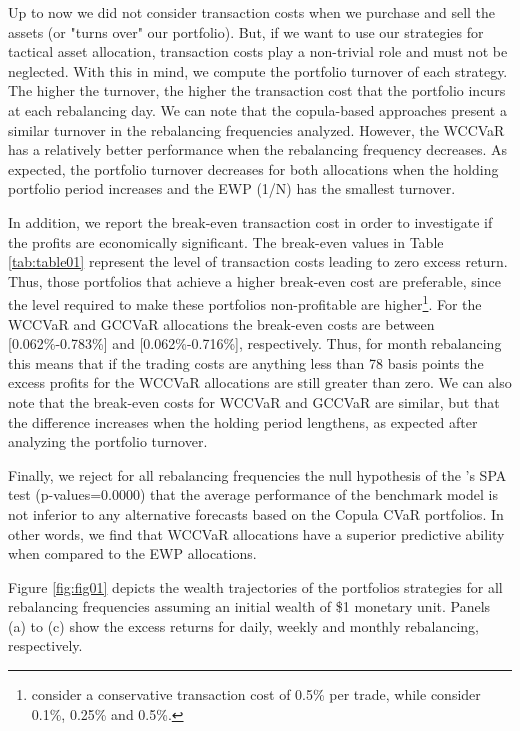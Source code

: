 \documentclass[a4paper,10pt]{article}
\begin{document}
Up to now we did not consider transaction costs when we purchase and sell
the assets (or "turns over" our portfolio). But, if we want to use our
strategies for tactical asset allocation, transaction costs play a
non-trivial role and must not be neglected. With this in mind, we compute
the portfolio turnover of each strategy. The higher the turnover, the higher
the transaction cost that the portfolio incurs at each rebalancing day. We can note that the copula-based approaches present a similar turnover in the rebalancing frequencies analyzed. However, the WCCVaR has a relatively better performance when the rebalancing frequency decreases. As expected, the portfolio turnover decreases for both allocations
when the holding portfolio period increases and the EWP (1/N) has the
smallest turnover.

In addition, we report the break-even transaction cost in order to investigate
if the profits are economically significant. The break-even values in Table
\ref{tab:table01} represent the level of transaction
costs leading to zero excess return. Thus, those portfolios that achieve a
higher break-even cost are preferable, since the level required to make
these portfolios non-profitable are higher\footnote{\citet*{jega1993} consider a conservative transaction cost of 0.5\% per
	trade, while \citet*{allen1999} consider 0.1\%, 0.25\% and 0.5\%.}. For the
WCCVaR and GCCVaR allocations the break-even costs are between [0.062\%-0.783\%]
and [0.062\%-0.716\%], respectively. Thus, for month rebalancing this means
that if the trading costs are anything less than 78 basis points the excess
profits for the WCCVaR allocations are still greater than zero. We can also note
that the break-even costs for WCCVaR and GCCVaR are similar, but that the
difference increases when the holding period lengthens, as expected after analyzing the portfolio turnover. 

Finally, we reject for all rebalancing frequencies the null hypothesis of the \citet*{hansen2005test}'s SPA test (p-values=0.0000) that the average performance of the benchmark model is not inferior to any alternative forecasts based on the Copula CVaR portfolios. In other words, we find that WCCVaR allocations have a superior predictive ability when compared to the EWP allocations.

Figure \ref{fig:fig01} depicts the wealth trajectories of the portfolios strategies for all rebalancing frequencies assuming an initial wealth of \$1 monetary unit. Panels (a) to (c) show the excess returns for daily, weekly and monthly rebalancing, respectively.
\end{document}
